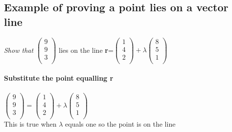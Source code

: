 \documentclass{article}[18pt]
\begin{document}
\subsection{Example of proving a point lies on a vector line}
\textit{Show that} $\begin{pmatrix}
9\\
9\\
3\\
\end{pmatrix}
$ lies on the line \textbf{r}=$\begin{pmatrix}
1\\
4\\
2\\
\end{pmatrix}+\lambda\begin{pmatrix}
8\\
5\\
1\\
\end{pmatrix}$\\
\\
\textbf{Substitute the point equalling r}\\
\\
$\begin{pmatrix}
9\\
9\\
3\\
\end{pmatrix}
=
\begin{pmatrix}
1\\
4\\
2\\
\end{pmatrix}+\lambda
\begin{pmatrix}
8\\
5\\
1\\
\end{pmatrix}$
\\
This is true when $\lambda$ equals one so the point is on the line
\end{document}

